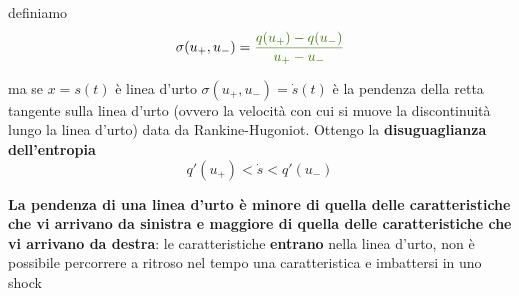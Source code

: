 \documentclass[10pt,a4paper,twoside,openright]{book}
\begin{document}
\begin{itemize}
\begin{figure}[htpb]
	\end{figure}
	\FloatBarrier


	definiamo \begin{equation*}
	\sigma ( u_{+} ,u_{-}) =\textcolor[rgb]{0.25,0.46,0.02}{\frac{q( u_{+}) -q( u_{-})}{u_{+} -u_{-}}}
	\end{equation*}

	ma se $\displaystyle x=s( t)$ è linea d'urto $\displaystyle \sigma ( u_{+} ,u_{-}) =\dot{s}( t)$ è la pendenza della retta tangente sulla linea d'urto (ovvero la velocità con cui si muove la discontinuità lungo la linea d'urto) data da Rankine-Hugoniot. Ottengo la \textbf{disuguaglianza dell'entropia}
	\begin{equation*}
		q'( u_{+}) < \dot{s} < q'( u_{-})
	\end{equation*}

	\textbf{La pendenza di una linea d'urto è minore di quella delle caratteristiche che vi arrivano da sinistra e maggiore di quella delle caratteristiche che vi arrivano da destra}: le caratteristiche \textbf{entrano} nella linea d'urto, non è possibile percorrere a ritroso nel tempo una caratteristica e imbattersi in uno shock

	\begin{figure}[htpb]
		\centering

		\begin{tikzpicture}[x=0.75pt,y=0.75pt,yscale=-1,xscale=1]


\end{tikzpicture}
\end{figure}
\end{itemize}
\end{document}
